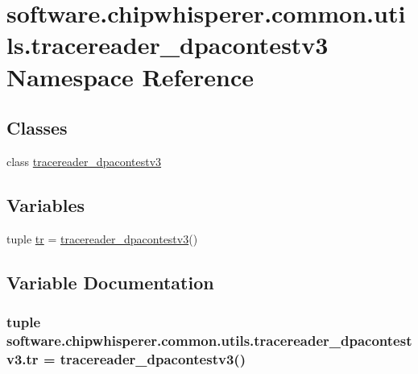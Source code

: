 \hypertarget{namespacesoftware_1_1chipwhisperer_1_1common_1_1utils_1_1tracereader__dpacontestv3}{}\section{software.\+chipwhisperer.\+common.\+utils.\+tracereader\+\_\+dpacontestv3 Namespace Reference}
\label{namespacesoftware_1_1chipwhisperer_1_1common_1_1utils_1_1tracereader__dpacontestv3}
\subsection*{Classes}
\begin{DoxyCompactItemize}
\item 
class \hyperlink{classsoftware_1_1chipwhisperer_1_1common_1_1utils_1_1tracereader__dpacontestv3_1_1tracereader__dpacontestv3}{tracereader\+\_\+dpacontestv3}
\end{DoxyCompactItemize}
\subsection*{Variables}
\begin{DoxyCompactItemize}
\item 
tuple \hyperlink{namespacesoftware_1_1chipwhisperer_1_1common_1_1utils_1_1tracereader__dpacontestv3_ad6a5f39afb61a52c05fd2732b1ec080c}{tr} = \hyperlink{classsoftware_1_1chipwhisperer_1_1common_1_1utils_1_1tracereader__dpacontestv3_1_1tracereader__dpacontestv3}{tracereader\+\_\+dpacontestv3}()
\end{DoxyCompactItemize}


\subsection{Variable Documentation}
\hypertarget{namespacesoftware_1_1chipwhisperer_1_1common_1_1utils_1_1tracereader__dpacontestv3_ad6a5f39afb61a52c05fd2732b1ec080c}{}
\subsubsection[{tr}]{\setlength{\rightskip}{0pt plus 5cm}tuple software.\+chipwhisperer.\+common.\+utils.\+tracereader\+\_\+dpacontestv3.\+tr = {\bf tracereader\+\_\+dpacontestv3}()}\label{namespacesoftware_1_1chipwhisperer_1_1common_1_1utils_1_1tracereader__dpacontestv3_ad6a5f39afb61a52c05fd2732b1ec080c}

